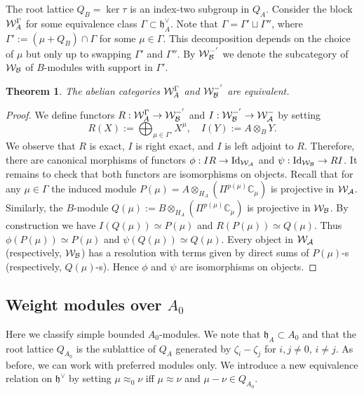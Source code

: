 \documentclass[12pt]{amsart}
\def\mathcal{\cal}
\theoremstyle{plain} %
\numberwithin{equation}{section}
\theoremstyle{definition}
\theoremstyle{remark}
\theoremstyle{plain} %
\newtheorem{theorem}[definition]{Theorem}
\newcommand{\cW}{\mathcal{W}}
\newcommand{\C}{\mathbb{C}}
\newcommand{\gh}{\mathfrak{h}}
\def\gh{\mathfrak{h}}
\begin{document}
  The root lattice $Q_{B}=\ker\tau$ is an index-two subgroup in $Q_A$. Consider the block ${\cW}_A^\Gamma$ for some equivalence
  class $\Gamma\subset \gh^\vee_A$. Note that $\Gamma=\Gamma'\sqcup \Gamma''$, where
  $\Gamma':=(\mu+Q_{B})\cap\Gamma$ for some $\mu\in\Gamma$. This decomposition depends on the choice of $\mu$ but only up to swapping $\Gamma'$ and
  $\Gamma''$. By $\cW_{B}^{\Gamma'}$ we denote the subcategory of $\cW_{B}$ of $B$-modules with support in $\Gamma'$.

  \begin{theorem}\label{even} The abelian categories  ${\cW}_A^\Gamma$ and $\cW_{B}^{\Gamma'}$ are equivalent.
  \end{theorem}
  \begin{proof} We define functors $R:{\cW}_A^\Gamma \to \cW_{B}^{\Gamma'}$ and $I:\cW_{B}^{\Gamma'}\to{\cW}_A^\Gamma$ by setting
    $$R(X):=\bigoplus_{\mu\in\Gamma'} X^\mu,\quad I(Y):=A\otimes_{B}Y.$$
    We observe that $R$ is exact,  $I$ is right exact, and $I$ is left adjoint to $R$. Therefore, there are  canonical morphisms of functors $\phi:IR\to \operatorname{Id}_{\cW_{A}}$ and $\psi:\operatorname{Id}_{\cW_{B}}\to RI$.
    It remains to check that both functors are isomorphisms on objects. Recall that for any $\mu\in \Gamma$ the induced module $P(\mu)=A\otimes_{H_A} \left( \Pi^{p(\mu)} \C_{\mu} \right)$ is projective in $\cW_A$. Similarly, the $B$-module
    $Q(\mu):=B\otimes_{H_A} \left( \Pi^{p(\mu)} \C_{\mu} \right)$ is projective in $\cW_{B}$. By construction we have $I(Q(\mu))\simeq P(\mu)$ and $R(P(\mu))\simeq Q(\mu)$. Thus $\phi(P(\mu))\simeq P(\mu)$ and $\psi(Q(\mu))\simeq Q(\mu)$.
   Every object in $\cW_A$ (respectively, $\cW_B$) has a resolution with terms given by direct sums of $P(\mu)$-s (respectively, $Q(\mu)$-s). Hence $\phi$ and $\psi$ are isomorphisms on  objects.
         \end{proof}

    \subsection{Weight modules over $A_0$} Here we classify simple bounded $A_0$-modules. 
    We note that  $\gh_A\subset A_0$ and that the root lattice $Q_{A_0}$ is the sublattice of $Q_A$ generated by $\zeta_i-\zeta_j$ for  $i,j\neq 0$, $i \neq j$.  As before, we can work with preferred modules only.
    We introduce a new equivalence relation on $\gh^\vee$ by setting $\mu\approx_{0}\nu$
    iff $\mu\approx\nu$ and $\mu-\nu\in Q_{A_0}$.
\end{document}
